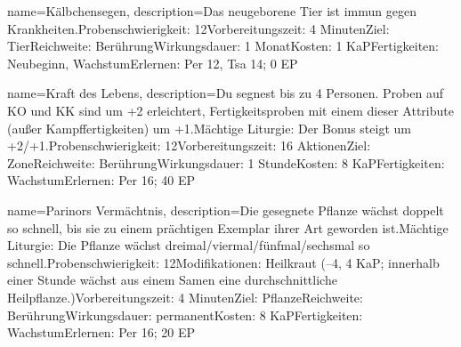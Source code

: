 {
    name={Kälbchensegen},
    description={Das neugeborene Tier ist immun gegen Krankheiten.\newline Probenschwierigkeit: 12\newline Vorbereitungszeit: 4 Minuten\newline Ziel: Tier\newline Reichweite: Berührung\newline Wirkungsdauer: 1 Monat\newline Kosten: 1 KaP\newline Fertigkeiten: Neubeginn, Wachstum\newline Erlernen: Per 12, Tsa 14; 0 EP}
}


{
    name={Kraft des Lebens},
    description={Du segnest bis zu 4 Personen. Proben auf KO und KK sind um +2 erleichtert, Fertigkeitsproben mit einem dieser Attribute (außer Kampffertigkeiten) um +1.\newline Mächtige Liturgie: Der Bonus steigt um +2/+1.\newline Probenschwierigkeit: 12\newline Vorbereitungszeit: 16 Aktionen\newline Ziel: Zone\newline Reichweite: Berührung\newline Wirkungsdauer: 1 Stunde\newline Kosten: 8 KaP\newline Fertigkeiten: Wachstum\newline Erlernen: Per 16; 40 EP}
}


{
    name={Parinors Vermächtnis},
    description={Die gesegnete Pflanze wächst doppelt so schnell, bis sie zu einem prächtigen Exemplar ihrer Art geworden ist.\newline Mächtige Liturgie: Die Pflanze wächst dreimal/viermal/fünfmal/sechsmal so schnell.\newline Probenschwierigkeit: 12\newline Modifikationen: Heilkraut (–4, 4 KaP; innerhalb einer Stunde wächst aus einem Samen eine durchschnittliche Heilpflanze.)\newline Vorbereitungszeit: 4 Minuten\newline Ziel: Pflanze\newline Reichweite: Berührung\newline Wirkungsdauer: permanent\newline Kosten: 8 KaP\newline Fertigkeiten: Wachstum\newline Erlernen: Per 16; 20 EP}
}


